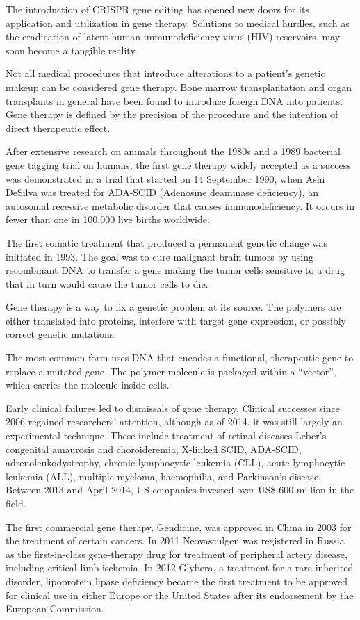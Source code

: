 The introduction of CRISPR gene editing has opened new doors for its application and utilization in gene therapy. Solutions to medical hurdles, such as the eradication of latent human immunodeficiency virus (HIV) reservoirs, may soon become a tangible reality.

Not all medical procedures that introduce alterations to a patient's genetic makeup can be considered gene therapy. Bone marrow transplantation and organ transplants in general have been found to introduce foreign DNA into patients. Gene therapy is defined by the precision of the procedure and the intention of direct therapeutic effect.

After extensive research on animals throughout the 1980s and a 1989 bacterial gene tagging trial on humans, the first gene therapy widely accepted as a success was demonstrated in a trial that started on 14 September 1990, when Ashi DeSilva was treated for \href{https://en.wikipedia.org/wiki/Adenosine_deaminase_deficiency}{ADA-SCID} (Adenosine deaminase deficiency), an autosomal recessive metabolic disorder that causes immunodeficiency. It occurs in fewer than one in 100,000 live births worldwide.

The first somatic treatment that produced a permanent genetic change was initiated in 1993. The goal was to cure malignant brain tumors by using recombinant DNA to transfer a gene making the tumor cells sensitive to a drug that in turn would cause the tumor cells to die.

Gene therapy is a way to fix a genetic problem at its source. The polymers are either translated into proteins, interfere with target gene expression, or possibly correct genetic mutations.

The most common form uses DNA that encodes a functional, therapeutic gene to replace a mutated gene. The polymer molecule is packaged within a ``vector'', which carries the molecule inside cells.

Early clinical failures led to dismissals of gene therapy. Clinical successes since 2006 regained researchers' attention, although as of 2014, it was still largely an experimental technique. These include treatment of retinal diseases Leber's congenital amaurosis and choroideremia, X-linked SCID, ADA-SCID, adrenoleukodystrophy, chronic lymphocytic leukemia (CLL), acute lymphocytic leukemia (ALL), multiple myeloma, haemophilia, and Parkinson's disease. Between 2013 and April 2014, US companies invested over US\$ 600 million in the field.

The first commercial gene therapy, Gendicine, was approved in China in 2003 for the treatment of certain cancers. In 2011 Neovasculgen was registered in Russia as the first-in-class gene-therapy drug for treatment of peripheral artery disease, including critical limb ischemia. In 2012 Glybera, a treatment for a rare inherited disorder, lipoprotein lipase deficiency became the first treatment to be approved for clinical use in either Europe or the United States after its endorsement by the European Commission.

